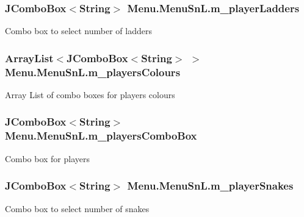 \subsubsection[{m\+\_\+player\+Ladders}]{\setlength{\rightskip}{0pt plus 5cm}J\+Combo\+Box$<$String$>$ Menu.\+Menu\+Sn\+L.\+m\+\_\+player\+Ladders\hspace{0.3cm}{\ttfamily [private]}}\label{class_menu_1_1_menu_sn_l_a75cae58abbeef1dc893ab2214f84aaad}
Combo box to select number of ladders \hypertarget{class_menu_1_1_menu_sn_l_a99b5b387a1ff9257d77534ebff7ca370}{}
\subsubsection[{m\+\_\+players\+Colours}]{\setlength{\rightskip}{0pt plus 5cm}Array\+List$<$J\+Combo\+Box$<$String$>$ $>$ Menu.\+Menu\+Sn\+L.\+m\+\_\+players\+Colours\hspace{0.3cm}{\ttfamily [private]}}\label{class_menu_1_1_menu_sn_l_a99b5b387a1ff9257d77534ebff7ca370}
Array List of combo boxes for player\textquotesingle{}s colours \hypertarget{class_menu_1_1_menu_sn_l_a52b5fdac24b1860a453eee6f505208da}{}
\subsubsection[{m\+\_\+players\+Combo\+Box}]{\setlength{\rightskip}{0pt plus 5cm}J\+Combo\+Box$<$String$>$ Menu.\+Menu\+Sn\+L.\+m\+\_\+players\+Combo\+Box\hspace{0.3cm}{\ttfamily [private]}}\label{class_menu_1_1_menu_sn_l_a52b5fdac24b1860a453eee6f505208da}
Combo box for players \hypertarget{class_menu_1_1_menu_sn_l_acc735c8e538c308d888618f726ddd344}{}
\subsubsection[{m\+\_\+player\+Snakes}]{\setlength{\rightskip}{0pt plus 5cm}J\+Combo\+Box$<$String$>$ Menu.\+Menu\+Sn\+L.\+m\+\_\+player\+Snakes\hspace{0.3cm}{\ttfamily [private]}}\label{class_menu_1_1_menu_sn_l_acc735c8e538c308d888618f726ddd344}
Combo box to select number of snakes \hypertarget{class_menu_1_1_menu_sn_l_a8e5b5896ffe07afef10443fe99b45dab}{}
